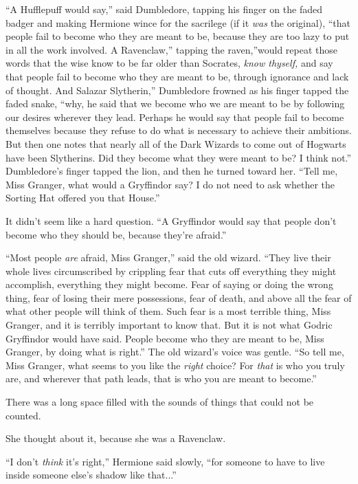 ``A Hufflepuff would say,'' said Dumbledore, tapping his finger on the
faded badger and making Hermione wince for the sacrilege (if it
\emph{was} the original), ``that people fail to become who they are
meant to be, because they are too lazy to put in all the work involved.
A Ravenclaw,'' tapping the raven,''would repeat those words that the
wise know to be far older than Socrates, \emph{know thyself,} and say
that people fail to become who they are meant to be, through ignorance
and lack of thought. And Salazar Slytherin,'' Dumbledore frowned as his
finger tapped the faded snake, ``why, he said that we become who we are
meant to be by following our desires wherever they lead. Perhaps he
would say that people fail to become themselves because they refuse to
do what is necessary to achieve their ambitions. But then one notes that
nearly all of the Dark Wizards to come out of Hogwarts have been
Slytherins. Did they become what they were meant to be? I think not.''
Dumbledore's finger tapped the lion, and then he turned toward her.
``Tell me, Miss Granger, what would a Gryffindor say? I do not need to
ask whether the Sorting Hat offered you that House.''

It didn't seem like a hard question. ``A Gryffindor would say that
people don't become who they should be, because they're afraid.''

``Most people \emph{are} afraid, Miss Granger,'' said the old wizard.
``They live their whole lives circumscribed by crippling fear that cuts
off everything they might accomplish, everything they might become. Fear
of saying or doing the wrong thing, fear of losing their mere
possessions, fear of death, and above all the fear of what other people
will think of them. Such fear is a most terrible thing, Miss Granger,
and it is terribly important to know that. But it is not what Godric
Gryffindor would have said. People become who they are meant to be, Miss
Granger, by doing what is right.'' The old wizard's voice was gentle.
``So tell me, Miss Granger, what seems to you like the \emph{right}
choice? For \emph{that} is who you truly are, and wherever that path
leads, that is who you are meant to become.''

There was a long space filled with the sounds of things that could not
be counted.

She thought about it, because she was a Ravenclaw.

``I don't \emph{think} it's right,'' Hermione said slowly, ``for someone
to have to live inside someone else's shadow like that...''


